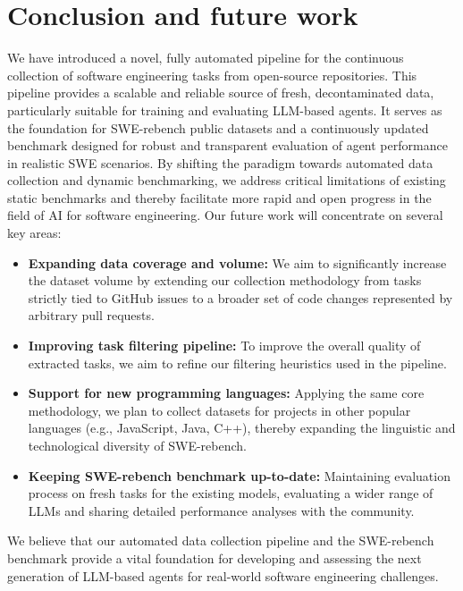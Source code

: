 \documentclass[dandb]{article}
\begin{document}
\section{Conclusion and future work}

We have introduced a novel, fully automated pipeline for the continuous collection of software engineering tasks from open-source repositories. This pipeline provides a scalable and reliable source of fresh, decontaminated data, particularly suitable for training and evaluating LLM-based agents. It serves as the foundation for SWE-rebench public datasets and a continuously updated benchmark designed for robust and transparent evaluation of agent performance in realistic SWE scenarios. By shifting the paradigm towards automated data collection and dynamic benchmarking, we address critical limitations of existing static benchmarks and thereby facilitate more rapid and open progress in the field of AI for software engineering. Our future work will concentrate on several key areas:

\begin{itemize}
    \item \textbf{Expanding data coverage and volume:} We aim to significantly increase the dataset volume by extending our collection methodology from tasks strictly tied to GitHub issues to a broader set of code changes represented by arbitrary pull requests.
    \item \textbf{Improving task filtering pipeline:} To improve the overall quality of extracted tasks, we aim to refine our filtering heuristics used in the pipeline.
    \item \textbf{Support for new programming languages:} Applying the same core methodology, we plan to collect datasets for projects in other popular languages (e.g., JavaScript, Java, C++), thereby expanding the linguistic and technological diversity of SWE-rebench.
    \item \textbf{Keeping SWE-rebench benchmark up-to-date:} Maintaining evaluation process on fresh tasks for the existing models, evaluating a wider range of LLMs and sharing detailed performance analyses with the community.
\end{itemize}

We believe that our automated data collection pipeline and the SWE-rebench benchmark provide a vital foundation for developing and assessing the next generation of LLM-based agents for real-world software engineering challenges.




\end{document}
